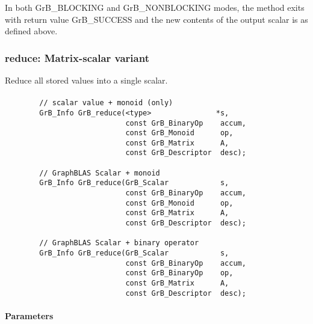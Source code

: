 In both {\sf GrB\_BLOCKING} and {\sf GrB\_NONBLOCKING} modes, the method exits with return value 
{\sf GrB\_SUCCESS} and the new contents of the output scalar is as defined above.



\subsubsection{{\sf reduce}: Matrix-scalar variant}
\label{Sec:Reduce_matrix_scalar}

Reduce all stored values into a single scalar.

\paragraph{\syntax}

\begin{verbatim}
        // scalar value + monoid (only)
        GrB_Info GrB_reduce(<type>               *s,
                            const GrB_BinaryOp    accum,
                            const GrB_Monoid      op,
                            const GrB_Matrix      A,
                            const GrB_Descriptor  desc);

        // GraphBLAS Scalar + monoid
        GrB_Info GrB_reduce(GrB_Scalar            s,
                            const GrB_BinaryOp    accum,
                            const GrB_Monoid      op,
                            const GrB_Matrix      A,
                            const GrB_Descriptor  desc);

        // GraphBLAS Scalar + binary operator
        GrB_Info GrB_reduce(GrB_Scalar            s,
                            const GrB_BinaryOp    accum,
                            const GrB_BinaryOp    op,
                            const GrB_Matrix      A,
                            const GrB_Descriptor  desc);
\end{verbatim}

\paragraph{Parameters}

